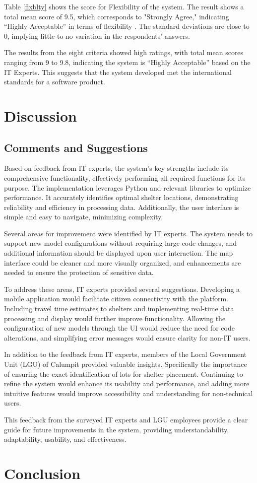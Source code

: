 \documentclass[12pt,a4paper,]{article}
\begin{document}
	Table \ref{flxblty} shows the score for Flexibility of the system. The result shows a total mean score of 9.5, which corresponds to "Strongly Agree," indicating “Highly Acceptable” in terms of flexibility . The standard deviations are close to 0, implying little to no variation in the respondents’ answers.
	
	The results from the eight criteria showed high ratings, with total mean scores ranging from 9 to 9.8, indicating the system is “Highly Acceptable” based on the IT Experts. This suggests that the system developed met the international standards for a software product.
	

\section{Discussion}
	\subsection{Comments and Suggestions}
	Based on feedback from IT experts, the system's key strengths include its comprehensive functionality, effectively performing all required functions for its purpose. The implementation leverages Python and relevant libraries to optimize performance. It accurately identifies optimal shelter locations, demonstrating reliability and efficiency in processing data. Additionally, the user interface is simple and easy to navigate, minimizing complexity.
	
	Several areas for improvement were identified by IT experts. The system needs to support new model configurations without requiring large code changes, and additional information should be displayed upon user interaction. The map interface could be cleaner and more visually organized, and enhancements are needed to ensure the protection of sensitive data.
	
	To address these areas, IT experts provided several suggestions. Developing a mobile application would facilitate citizen connectivity with the platform. Including travel time estimates to shelters and implementing real-time data processing and display would further improve functionality. Allowing the configuration of new models through the UI would reduce the need for code alterations, and simplifying error messages would ensure clarity for non-IT users.
	
	In addition to the feedback from IT experts, members of the Local Government Unit (LGU) of Calumpit provided valuable insights. Specifically the importance of ensuring the exact identification of lots for shelter placement. Continuing to refine the system would enhance its usability and performance, and adding more intuitive features would improve accessibility and understanding for non-technical users.
	
	This feedback from the surveyed IT experts and LGU employees provide a clear guide for future improvements in the system, providing understandability, adaptability, usability, and effectiveness.
	

\section{Conclusion}
\printbibliography[heading=bibintoc,title={REFERENCES}] %
\end{document}
